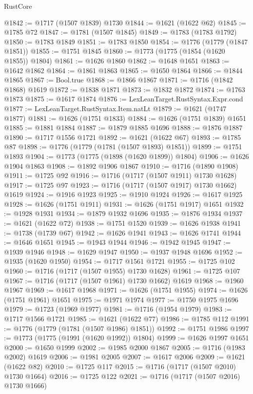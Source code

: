 \begin{lexlean}{RustCore}
\begin{coremodule}
@1842 := @1717 (@1507 @1839) @1730
@1844 := @1621 (@1622 @62)
@1845 := @1785 @72
@1847 := @1781 (@1507 @1845)
@1849 := @1783 (@1783 @1792)
@1850 := @1783 @1849
@1851 := @1783 @1850
@1854 := @1776 (@1779 (@1847 @1851))
@1855 := @1751 @1845
@1860 := @1773 (@1775 (@1854 (@1620 @1855)) @1804)
@1861 := @1626 @1860
@1862 := @1648 @1651
@1863 := @1642 @1862
@1864 := @1861 @1863
@1865 := @1650 @1864
@1866 := @1844 @1865
@1867 := Bool.true
@1868 := @1866 @1867
@1871 := @1716 (@1842 @1868) @1619
@1872 := @1838 @1871
@1873 := @1832 @1872
@1874 := @1763 @1873
@1875 := @1617 @1874
@1876 := LexLeanTarget.RustSyntax.Expr.cond
@1877 := LexLeanTarget.RustSyntax.Item.natLt
@1879 := @1621 (@1747 @1877)
@1881 := @1626 (@1751 @1833)
@1884 := @1626 (@1751 @1839) @1651
@1885 := @1881 @1884
@1887 := @1879 @1885 @1696
@1888 := @1876 @1887
@1890 := @1717 @1556 @1721
@1892 := @1621 (@1622 @67)
@1893 := @1785 @87
@1898 := @1776 (@1779 (@1781 (@1507 @1893) @1851))
@1899 := @1751 @1893
@1904 := @1773 (@1775 (@1898 (@1620 @1899)) @1804)
@1906 := @1626 @1904 @1863
@1908 := @1892 @1906 @1867
@1910 := @1716 (@1890 @1908)
@1911 := @1725 @92
@1916 := @1716 (@1717 (@1507 @1911) @1730 @1628)
@1917 := @1725 @97
@1923 := @1716 (@1717 (@1507 @1917) @1730 @1662) @1619
@1924 := @1916 @1923
@1925 := @1910 @1924
@1926 := @1617 @1925
@1928 := @1626 (@1751 @1911)
@1931 := @1626 (@1751 @1917) @1651
@1932 := @1928 @1931
@1934 := @1879 @1932 @1696
@1935 := @1876 @1934
@1937 := @1621 (@1622 @72)
@1938 := @1751 @1520
@1939 := @1626 @1938
@1941 := @1738 (@1739 @67)
@1942 := @1626 @1941
@1943 := @1626 @1741
@1944 := @1646 @1651
@1945 := @1943 @1944
@1946 := @1942 @1945
@1947 := @1939 @1946
@1948 := @1629 @1947
@1950 := @1937 @1948 @1696
@1952 := @1935 (@1620 @1950)
@1954 := @1717 @1561 @1721
@1955 := @1725 @102
@1960 := @1716 (@1717 (@1507 @1955) @1730 @1628)
@1961 := @1725 @107
@1967 := @1716 (@1717 (@1507 @1961) @1730 @1662) @1619
@1968 := @1960 @1967
@1969 := @1617 @1968
@1971 := @1626 (@1751 @1955)
@1974 := @1626 (@1751 @1961) @1651
@1975 := @1971 @1974
@1977 := @1750 @1975 @1696
@1979 := @1723 (@1969 @1977)
@1981 := @1716 (@1954 @1979)
@1983 := @1717 @1566 @1721
@1985 := @1621 (@1622 @77)
@1986 := @1785 @112
@1991 := @1776 (@1779 (@1781 (@1507 @1986) @1851))
@1992 := @1751 @1986
@1997 := @1773 (@1775 (@1991 (@1620 @1992)) @1804)
@1999 := @1626 @1997 @1651
@2000 := @1650 @1999
@2002 := @1985 @2000 @1867
@2005 := @1716 (@1983 @2002) @1619
@2006 := @1981 @2005
@2007 := @1617 @2006
@2009 := @1621 (@1622 @82)
@2010 := @1725 @117
@2015 := @1716 (@1717 (@1507 @2010) @1730 @1664)
@2016 := @1725 @122
@2021 := @1716 (@1717 (@1507 @2016) @1730 @1666)

\end{coremodule}
\end{lexlean}
